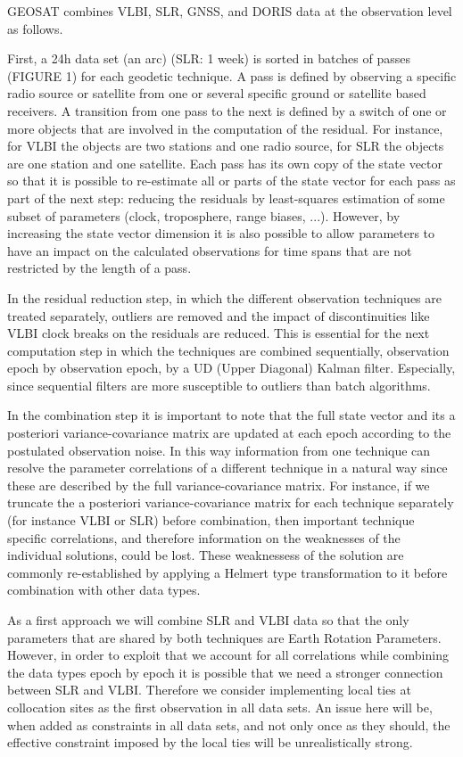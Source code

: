 GEOSAT combines VLBI, SLR, GNSS, and DORIS data at the observation level as follows.

First, a 24h data set (an arc) (SLR: 1 week) is sorted in batches of
passes (FIGURE 1) for each geodetic technique. A pass is defined by observing a specific radio source or satellite from one or several specific ground or satellite based receivers. A transition from one pass to the next is defined
by a switch of one or more objects that are involved in the
computation of the residual. For instance, for VLBI the objects are
two stations and one radio source, for SLR the objects are one station
and one satellite. Each pass has its own copy of the state vector so
that it is possible to re-estimate all or parts of the state vector
for each pass as part of the next step: reducing the residuals by
least-squares estimation of some subset of 
parameters (clock, troposphere, range biases, ...). However, by increasing the state vector dimension it is
also possible to allow parameters to have an impact on the calculated
observations for time spans that are not restricted by the length of a
pass.

In the residual reduction step, in which the different observation techniques
are treated separately, outliers are removed and the impact of
discontinuities like VLBI clock breaks on the residuals are
reduced. This is essential for the next computation step in which the
techniques are combined sequentially, observation epoch by observation
epoch, by a UD (Upper Diagonal) Kalman filter. Especially, since sequential filters are more
susceptible to outliers than batch algorithms.

In the combination step it is important to note that the full state
vector and its a posteriori variance-covariance matrix are updated at
each epoch according to the postulated observation noise. In this way
information from one technique can resolve the parameter correlations
of a different technique in a natural way since these are described by
the full variance-covariance matrix. For instance, if we truncate the a posteriori variance-covariance matrix for each technique separately (for instance VLBI or SLR) before combination,
then important technique specific correlations, and therefore
information on the weaknesses of the individual solutions, could be lost. These
weaknessess of the solution are commonly re-established by applying a
Helmert type transformation to it before combination with other data
types.

As a first approach we will combine SLR and VLBI data so that the only parameters that
are shared by both techniques are Earth Rotation Parameters. However, in order to exploit that we
account for all correlations while combining the data types epoch by epoch it is possible that we
need a stronger connection between SLR and VLBI. Therefore we consider
implementing local ties at collocation sites as the first observation
in all data sets. An issue here will be, when added as
constraints in all data sets, and not only once as they should, the effective constraint imposed by the local
ties will be unrealistically strong.

